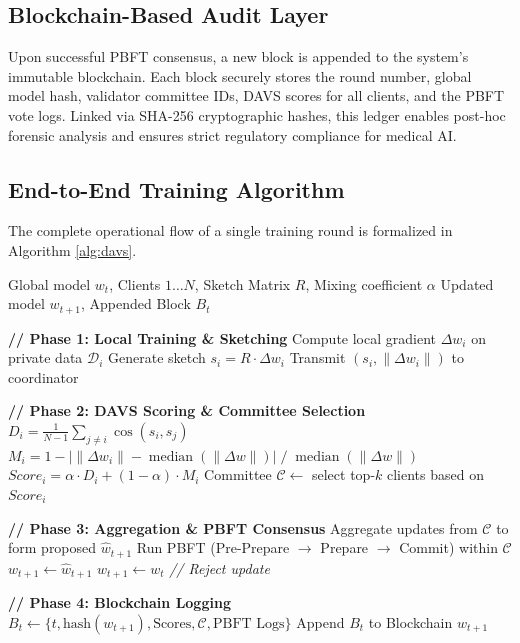 \documentclass[conference]{IEEEtran}
\begin{document}
\subsection{Blockchain-Based Audit Layer}
Upon successful PBFT consensus, a new block is appended to the system's immutable blockchain. Each block securely stores the round number, global model hash, validator committee IDs, DAVS scores for all clients, and the PBFT vote logs. Linked via SHA-256 cryptographic hashes, this ledger enables post-hoc forensic analysis and ensures strict regulatory compliance for medical AI.

\subsection{End-to-End Training Algorithm}
The complete operational flow of a single training round is formalized in Algorithm \ref{alg:davs}.

\begin{algorithm}
\caption{DAVS: Single Federated Training Round}
\label{alg:davs}
\begin{algorithmic}[1]
\REQUIRE Global model $w_t$, Clients $1\ldots N$, Sketch Matrix $R$, Mixing coefficient $\alpha$
\ENSURE Updated model $w_{t+1}$, Appended Block $B_t$

\STATE \textbf{// Phase 1: Local Training \& Sketching}
    \STATE Compute local gradient $\Delta w_i$ on private data $\mathcal{D}_i$
    \STATE Generate sketch $s_i = R \cdot \Delta w_i$
    \STATE Transmit $(s_i, \|\Delta w_i\|)$ to coordinator
\ENDFOR

\STATE \textbf{// Phase 2: DAVS Scoring \& Committee Selection}
    \STATE $D_i = \frac{1}{N-1}\sum_{j \neq i} \cos(s_i, s_j)$
    \STATE $M_i = 1 - |\|\Delta w_i\| - \operatorname{median}(\|\Delta w\|)| \;/\; \operatorname{median}(\|\Delta w\|)$
    \STATE $Score_i = \alpha \cdot D_i + (1 - \alpha) \cdot M_i$
\ENDFOR
\STATE Committee $\mathcal{C} \leftarrow$ select top-$k$ clients based on $Score_i$

\STATE \textbf{// Phase 3: Aggregation \& PBFT Consensus}
\STATE Aggregate updates from $\mathcal{C}$ to form proposed $\hat{w}_{t+1}$
\STATE Run PBFT (Pre-Prepare $\rightarrow$ Prepare $\rightarrow$ Commit) within $\mathcal{C}$
    \STATE $w_{t+1} \leftarrow \hat{w}_{t+1}$
\ELSE
    \STATE $w_{t+1} \leftarrow w_t$ \quad \textit{// Reject update}
\ENDIF

\STATE \textbf{// Phase 4: Blockchain Logging}
\STATE $B_t \leftarrow \{t, \text{hash}(w_{t+1}), \text{Scores}, \mathcal{C}, \text{PBFT Logs}\}$
\STATE Append $B_t$ to Blockchain
\RETURN $w_{t+1}$
\end{algorithmic}
\end{algorithm}
\end{document}
